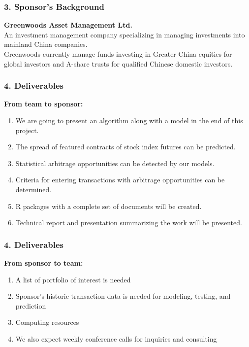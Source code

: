 \documentclass[compress,handout,10pt]{beamer}
\let\olditem\item
\renewcommand{\item}{\setlength{\itemsep}{0.5\baselineskip}\olditem}
\begin{document}
\begin{frame}
    \frametitle{3. Sponsor's Background}
{\bf{Greenwoods Asset Management Ltd.}}\\
\vspace{7pt}
 An investment management company specializing in managing investments into mainland China companies.\\
\vspace{7pt}
Greenwoods currently manage funds investing in Greater China equities for global investors and A-share trusts for qualified Chinese domestic investors.
\end{frame}

\begin{frame}
    \frametitle{4. Deliverables}
{\bf{From team to sponsor:}}\\
\vspace{3pt}
    \begin{enumerate}
 \item We are going to present an algorithm along with a model in the end of this
project.
\item The spread of featured contracts of stock index futures can be predicted.
\item Statistical arbitrage opportunities can be detected by our models.
\item Criteria for entering transactions with arbitrage opportunities can be determined.
\item R packages with a complete set of documents will be created.
\item Technical report and presentation summarizing the work will be presented.
    \end{enumerate}
\end{frame}

\begin{frame}
    \frametitle{4. Deliverables}
{\bf{From sponsor to team:}}\\
\vspace{3pt}
    \begin{enumerate}
\item A list of portfolio of interest is needed
\item Sponsor's historic transaction data is needed for modeling, testing, and prediction
\item Computing resources
\item We also expect weekly conference calls for inquiries and consulting

    \end{enumerate}
\end{frame}
\end{document}
